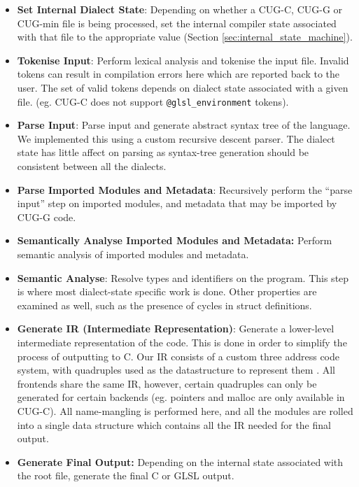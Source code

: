\documentclass[a4paper,12pt,twoside,openright]{report}
\begin{document}
\begin{itemize}

    \item \textbf{Set Internal Dialect State}: Depending on whether a CUG-C,
    CUG-G or CUG-min file is being processed, set the internal compiler state
    associated with that file to the appropriate value (Section
    \ref{sec:internal_state_machine}).

    \item \textbf{Tokenise Input}: Perform lexical analysis and tokenise the
    input file. Invalid tokens can result in compilation errors here which are
    reported back to the user. The set of valid tokens depends on dialect state
    associated with a given file. (eg. CUG-C does not support
    \texttt{@glsl\_environment} tokens).

    \item \textbf{Parse Input}: Parse input and generate abstract syntax tree
    of the language. We implemented this using a custom recursive descent
    parser. The dialect state has little affect on parsing as syntax-tree
    generation should be consistent between all the dialects.

    \item \textbf{Parse Imported Modules and Metadata}: Recursively perform the
    ``parse input'' step on imported modules, and metadata that may be imported
    by CUG-G code.

    \item \textbf{Semantically Analyse Imported Modules and Metadata:} Perform
    semantic analysis of imported modules and metadata.

    \item \textbf{Semantic Analyse}: Resolve types and identifiers on the
    program. This step is where most dialect-state specific work is done. Other
    properties are examined as well, such as the presence of cycles in struct
    definitions.

    \item \textbf{Generate IR (Intermediate Representation)}: Generate a
    lower-level intermediate representation of the code. This is done in order
    to simplify the process of outputting to C. Our IR consists of a custom
    three address code system, with quadruples used as the datastructure to
    represent them \cite{ThreeAddressCode}. All frontends share the same IR,
    however, certain quadruples can only be generated for certain backends (eg.
    pointers and malloc are only available in CUG-C). All name-mangling is
    performed here, and all the modules are rolled into a single data structure
    which contains all the IR needed for the final output.

    \item \textbf{Generate Final Output:} Depending on the internal state
    associated with the root file, generate the final C or GLSL output.

\end{itemize}
\end{document}

